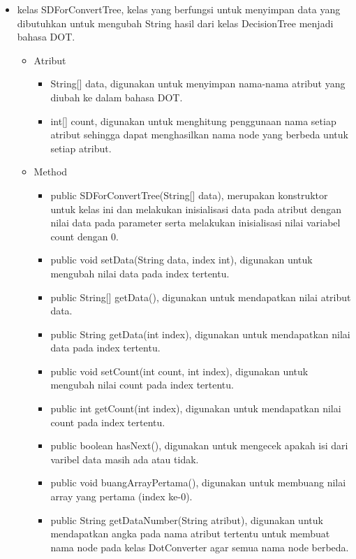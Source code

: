 \begin{itemize}
	\item kelas SDForConvertTree, kelas yang berfungsi untuk menyimpan data yang dibutuhkan untuk mengubah String hasil dari kelas DecisionTree menjadi bahasa DOT.
	\begin{itemize}
		\item Atribut
		\begin{itemize}
			\item String[] data, digunakan untuk menyimpan nama-nama atribut yang diubah ke dalam bahasa DOT.
			\item int[] count, digunakan untuk menghitung penggunaan nama setiap atribut sehingga dapat menghasilkan nama node yang berbeda untuk setiap atribut.
		\end{itemize}
		\item Method
		\begin{itemize}
			\item public SDForConvertTree(String[] data), merupakan konstruktor untuk kelas ini dan melakukan inisialisasi data pada atribut dengan nilai data pada parameter serta melakukan inisialisasi nilai variabel count dengan 0.
			\item public void setData(String data, index int), digunakan untuk mengubah nilai data pada index tertentu.
			\item public String[] getData(), digunakan untuk mendapatkan nilai atribut data.
			\item public String getData(int index), digunakan untuk mendapatkan nilai data pada index tertentu.
			\item public void setCount(int count, int index), digunakan untuk mengubah nilai count pada index tertentu.
			\item public int getCount(int index), digunakan untuk mendapatkan nilai count pada index tertentu.
			\item public boolean hasNext(), digunakan untuk mengecek apakah isi dari varibel data masih ada atau tidak.
			\item public void buangArrayPertama(), digunakan untuk membuang nilai array yang pertama (index ke-0).
			\item public String getDataNumber(String atribut), digunakan untuk mendapatkan angka pada nama atribut tertentu untuk membuat nama node pada kelas DotConverter agar semua nama node berbeda.
		\end{itemize}
	\end{itemize}
\end{itemize}

